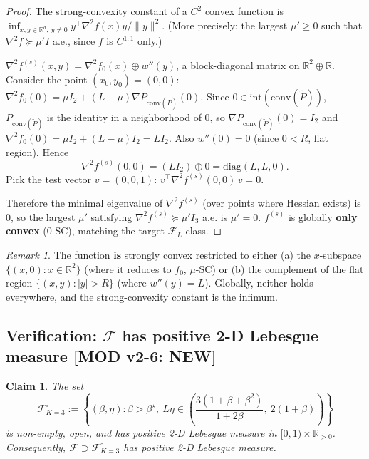 \documentclass[11pt,a4paper]{article}
\theoremstyle{plain}
\newtheorem{claim}[theorem]{Claim}
\theoremstyle{definition}
\theoremstyle{remark}
\newtheorem{remark}[theorem]{Remark}
\newcommand{\R}{\mathbb{R}}
\newcommand{\conv}{\mathrm{conv}}
\newcommand{\F}{\mathcal{F}}
\begin{document}
\begin{proof}
The strong-convexity constant of a $C^2$ convex function is $\inf_{x,y \in \R^d,\ y \neq 0} y^\top \nabla^2 f(x) y / \|y\|^2$. (More precisely: the largest $\mu' \geq 0$ such that $\nabla^2 f \succeq \mu' I$ a.e., since $f$ is $C^{1,1}$ only.)

$\nabla^2 f^{(s)}(x, y) = \nabla^2 f_0(x) \oplus w''(y)$, a block-diagonal matrix on $\R^2 \oplus \R$. Consider the point $(x_0, y_0) = (0, 0)$: $\nabla^2 f_0(0) = \mu I_2 + (L-\mu)\nabla P_{\conv(\widetilde P)}(0)$. Since $0 \in \mathrm{int}(\conv(\widetilde P))$, $P_{\conv(\widetilde P)}$ is the identity in a neighborhood of $0$, so $\nabla P_{\conv(\widetilde P)}(0) = I_2$ and $\nabla^2 f_0(0) = \mu I_2 + (L-\mu) I_2 = L I_2$. Also $w''(0) = 0$ (since $0 < R$, flat region). Hence
\[
\nabla^2 f^{(s)}(0, 0) = (L I_2) \oplus 0 = \mathrm{diag}(L, L, 0).
\]
Pick the test vector $v = (0, 0, 1)$: $v^\top \nabla^2 f^{(s)}(0, 0)\, v = 0$.

Therefore the minimal eigenvalue of $\nabla^2 f^{(s)}$ (over points where Hessian exists) is $0$, so the largest $\mu'$ satisfying $\nabla^2 f^{(s)} \succeq \mu' I_3$ a.e. is $\mu' = 0$. $f^{(s)}$ is globally \textbf{only convex} (0-SC), matching the target $\F_L$ class.
\end{proof}

\begin{remark}
The function \textbf{is} strongly convex restricted to either (a) the $x$-subspace $\{(x, 0) : x \in \R^2\}$ (where it reduces to $f_0$, $\mu$-SC) or (b) the complement of the flat region $\{(x, y) : |y| > R\}$ (where $w''(y) = L$). Globally, neither holds everywhere, and the strong-convexity constant is the infimum.
\end{remark}

\subsection{Verification: $\F$ has positive 2-D Lebesgue measure \textbf{[MOD v2-6: NEW]}}

\begin{claim}
\label{cla:2.13}
The set
\[
\F_{K=3}^\circ := \left\{(\beta, \eta) : \beta > \beta^\star,\ L\eta \in \left(\frac{3(1 + \beta + \beta^2)}{1 + 2\beta},\ 2(1+\beta)\right)\right\}
\]
is non-empty, open, and has positive 2-D Lebesgue measure in $[0,1)\times\R_{>0}$. Consequently, $\F \supset \F_{K=3}^\circ$ has positive 2-D Lebesgue measure.
\end{claim}
\end{document}
